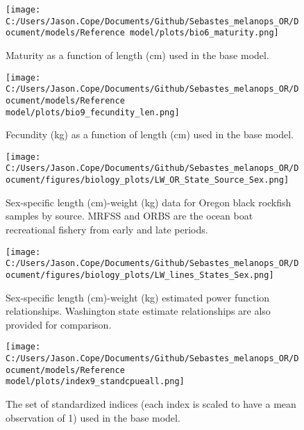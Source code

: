 \documentclass[11pt,
  english,
  letterpaper,
]{article}
\begin{document}
\newpage

\begin{figure}
\centering
\texttt{[image: C:/Users/Jason.Cope/Documents/Github/Sebastes\_melanops\_OR/Document/models/Reference model/plots/bio6\_maturity.png]}
\caption{Maturity as a function of length (cm) used in the base model.\label{fig:maturity}}
\end{figure}

\newpage

\begin{figure}
\centering
\texttt{[image: C:/Users/Jason.Cope/Documents/Github/Sebastes\_melanops\_OR/Document/models/Reference model/plots/bio9\_fecundity\_len.png]}
\caption{Fecundity (kg) as a function of length (cm) used in the base model.\label{fig:fecundity}}
\end{figure}

\newpage

\begin{figure}
\centering
\texttt{[image: C:/Users/Jason.Cope/Documents/Github/Sebastes\_melanops\_OR/Document/figures/biology\_plots/LW\_OR\_State\_Source\_Sex.png]}
\caption{Sex-specific length (cm)-weight (kg) data for Oregon black rockfish samples by source. MRFSS and ORBS are the ocean boat recreational fishery from early and late periods.\label{fig:len-weight-data}}
\end{figure}

\newpage

\begin{figure}
\centering
\texttt{[image: C:/Users/Jason.Cope/Documents/Github/Sebastes\_melanops\_OR/Document/figures/biology\_plots/LW\_lines\_States\_Sex.png]}
\caption{Sex-specific length (cm)-weight (kg) estimated power function relationships. Washington state estimate relationships are also provided for comparison.\label{fig:len-weight-or-wa}}
\end{figure}

\clearpage

\begin{figure}
\centering
\texttt{[image: C:/Users/Jason.Cope/Documents/Github/Sebastes\_melanops\_OR/Document/models/Reference model/plots/index9\_standcpueall.png]}
\caption{The set of standardized indices (each index is scaled to have a mean observation of 1) used in the base model.\label{fig:sur-summ-all}}
\end{figure}
\end{document}
